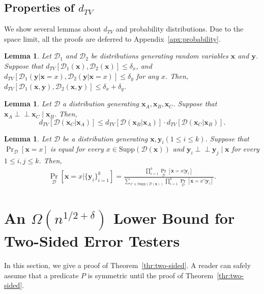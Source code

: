 \documentclass[letterpaper,11pt]{article}
\newtheorem{lemma}[theorem]{Lemma}
\newcommand{\dtv}{d_{TV}}
\newcommand{\cald}{\mathcal{D}}
\newcommand{\bfx}{\mathbf{x}}
\newcommand{\bfy}{\mathbf{y}}
\newcommand{\ci}{\perp\!\!\!\perp}
\newcommand{\supp}{\mathrm{Supp}}
\begin{document}
\subsection{Properties of $\dtv$}\label{subsec:probability}
We show several lemmas about $\dtv$ and probability distributions.
Due to the space limit, all the proofs are deferred to Appendix~\ref{apx:probability}.
\begin{lemma}\label{lmm:addition}
  Let $\cald_1$ and $\cald_2$ be distributions generating random variables $\bfx$ and $\bfy$.
  Suppose that \( \dtv[\cald_1(\bfx),\cald_2(\bfx)]\leq \delta_x\), and \( \dtv[\cald_1(\bfy|\bfx=x),\cald_2(\bfy|\bfx=x)]\leq \delta_y\) for any $x$.
  Then, \(\dtv[\cald_1(\bfx,\bfy),\cald_2(\bfx,\bfy)]\leq \delta_x + \delta_y \).
\end{lemma}
\begin{lemma}\label{lmm:serial}
  Let $\cald$ a distribution generating $\bfx_A,\bfx_B,\bfx_C$.
  Suppose that $\bfx_A\ci\bfx_C\mid\bfx_B$.
  Then,
  \[
  \dtv[\cald(\bfx_C|\bfx_A)]\leq \dtv[\cald(\bfx_B|\bfx_A)]\cdot \dtv[\cald(\bfx_C|\bfx_B)].
  \]
\end{lemma}
\begin{lemma}\label{lmm:product}
  Let $\cald$ be a distribution generating $\bfx,\bfy_i(1\leq i \leq k)$.
  Suppose that $\Pr_{\cald}[\bfx=x]$ is equal for every $x\in \supp(\cald(\bfx))$ and $\bfy_i\ci\bfy_j \mid \bfx$ for every $1\leq i,j\leq k$.
  Then,
  \begin{eqnarray*}
    \Pr_{\cald}[\bfx=x|\{\bfy_i\}_{i=1}^k]=\frac{\prod_{i=1}^{k}\Pr_{\cald}[\bfx=x|\bfy_i]}{\sum_{x'\in \supp(\cald(\bfx))}\prod_{i=1}^{k}\Pr_{\cald}[\bfx=x'|\bfy_i]}.
  \end{eqnarray*}
\end{lemma}

\section{An $\Omega(n^{1/2+\delta})$ Lower Bound for Two-Sided Error Testers}\label{sec:two-sided}
In this section, 
we give a proof of Theorem~\ref{thr:two-sided}.
A reader can safely assume that a predicate $P$ is symmetric until the proof of Theorem~\ref{thr:two-sided}.
\end{document}
